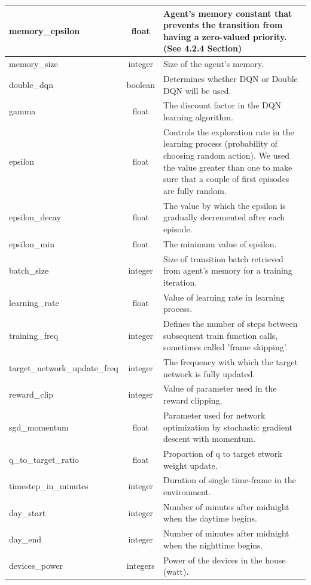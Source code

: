 \documentclass{article}
\begin{document}
{\begin{longtable}{l|c|p{9cm}}
    \hline
    memory\_epsilon & float & Agent's memory constant that prevents the transition from having a zero-valued priority. (See 4.2.4 Section)\\
    \hline
    memory\_size & integer & Size of the agent's memory.\\
    \hline
    double\_dqn & boolean & Determines whether DQN or Double DQN will  be used.\\
    \hline
    gamma & float & The discount factor in the DQN learning algorithm.\\
    \hline
    epsilon & float & Controls the exploration rate in the learning process (probability of choosing random action). We used the value greater than one to make sure that a couple of first episodes are fully random.\\
    \hline
    epsilon\_decay & float & The value by which the epsilon is gradually decremented after each episode.\\
    \hline
    epsilon\_min & float & The minimum value of epsilon.\\
    \hline
    batch\_size & integer & Size of transition batch retrieved from agent's memory for a training iteration.\\
    \hline
    learning\_rate & float & Value of learning rate in learning process.\\
    \hline
    training\_freq & integer & Defines the number of steps between subsequent train function calls, sometimes called 'frame skipping'.\\
    \hline
    target\_network\_update\_freq & integer & The frequency with which the target network is fully updated.\\
    \hline
    reward\_clip & integer & Value of parameter used in the reward clipping.\\
    \hline
    sgd\_momentum & float & Parameter used for network optimization by stochastic gradient descent with momentum.\\
    \hline
    q\_to\_target\_ratio & float & Proportion of q to target etwork weight update. \\
    \hline
    timestep\_in\_minutes & integer & Duration of single time-frame in the environment.\\
    \hline
    day\_start & integer & Number of minutes after midnight when the daytime begins.\\
    \hline
    day\_end & integer & Number of minutes after midnight when the nighttime begins.\\
    \hline
    devices\_power & integers & Power of the devices in the house (watt).\\

\end{longtable}}
\end{document}
